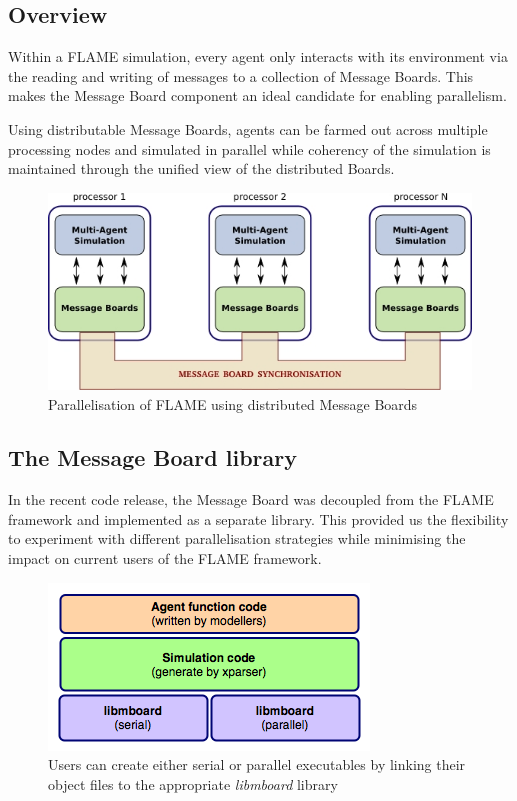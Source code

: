 \subsection{Overview}

Within a FLAME simulation, every agent only interacts with its environment via the reading and writing of messages to a collection of Message Boards. This makes the Message Board component an ideal candidate for enabling parallelism. 

Using distributable Message Boards, agents can be farmed out across multiple processing nodes and simulated in parallel while coherency of the simulation is maintained through the unified view of the distributed Boards.

\begin{figure}[h]
 \centering
  \includegraphics[scale=0.50]{mboard_flame.jpg}
 \caption{Parallelisation of FLAME using distributed Message Boards}
 \label{fig:mb_flame}
\end{figure}

\subsection{The Message Board library}
In the recent code release, the Message Board was decoupled from the FLAME framework and implemented as a separate library. This provided us the flexibility to experiment with different parallelisation strategies while minimising the impact on current users of the FLAME framework.

\begin{figure}[h]
 \centering
  \includegraphics[scale=0.60]{mboard_overview.png}
 \caption{Users can create either serial or parallel executables by linking their object files to the appropriate \textit{libmboard} library}
 \label{fig:mb_overview}
\end{figure}

